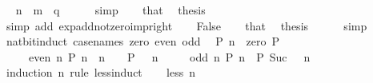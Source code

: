\begin{isabellebody}
\ \isamarkupfalse%
\ {\isacartoucheopen}n\ {\isacharequal}{\kern0pt}\ m\ {\isacharplus}{\kern0pt}\ q{\isacartoucheclose}\isanewline
\ \ \ \ \isamarkupfalse%
\ simp\isanewline
\ \ \isamarkupfalse%
\ that\ \isamarkupfalse%
\ {\isacharquery}{\kern0pt}thesis\isanewline
\ \ \ \ \isamarkupfalse%
\ {\isacharparenleft}{\kern0pt}simp\ add{\isacharcolon}{\kern0pt}\ exp{\isacharunderscore}{\kern0pt}add{\isacharunderscore}{\kern0pt}not{\isacharunderscore}{\kern0pt}zero{\isacharunderscore}{\kern0pt}imp{\isacharunderscore}{\kern0pt}right{\isacharparenright}{\kern0pt}\isanewline
{}\isamarkupfalse%
\isanewline
\ \ \isamarkupfalse%
\ False\isanewline
\ \ \isamarkupfalse%
\ that\ \isamarkupfalse%
\ {\isacharquery}{\kern0pt}thesis\isanewline
\ \ \ \ \isamarkupfalse%
\ simp\isanewline
{}\isamarkupfalse%
%
\endisatagproof
{\isafoldproof}%
%
\isadelimproof
\isanewline
%
\endisadelimproof
\isanewline
{}\isamarkupfalse%
\isanewline
\isanewline
{}\isamarkupfalse%
\ nat{\isacharunderscore}{\kern0pt}bit{\isacharunderscore}{\kern0pt}induct\ {\isacharbrackleft}{\kern0pt}case{\isacharunderscore}{\kern0pt}names\ zero\ even\ odd{\isacharbrackright}{\kern0pt}{\isacharcolon}{\kern0pt}\isanewline
\ \ {\isachardoublequoteopen}P\ n{\isachardoublequoteclose}\ \ zero{\isacharcolon}{\kern0pt}\ {\isachardoublequoteopen}P\ {}{\isachardoublequoteclose}\isanewline
\ \ \ \ \ even{\isacharcolon}{\kern0pt}\ {\isachardoublequoteopen}{\isasymAnd}n{\isachardot}{\kern0pt}\ P\ n\ {\isasymLongrightarrow}\ n\ {\isachargreater}{\kern0pt}\ {}\ {\isasymLongrightarrow}\ P\ {\isacharparenleft}{\kern0pt}{}\ {\isacharasterisk}{\kern0pt}\ n{\isacharparenright}{\kern0pt}{\isachardoublequoteclose}\isanewline
\ \ \ \ \ odd{\isacharcolon}{\kern0pt}\ {\isachardoublequoteopen}{\isasymAnd}n{\isachardot}{\kern0pt}\ P\ n\ {\isasymLongrightarrow}\ P\ {\isacharparenleft}{\kern0pt}Suc\ {\isacharparenleft}{\kern0pt}{}\ {\isacharasterisk}{\kern0pt}\ n{\isacharparenright}{\kern0pt}{\isacharparenright}{\kern0pt}{\isachardoublequoteclose}\isanewline
%
\isadelimproof
%
\endisadelimproof
%
\isatagproof
{}\isamarkupfalse%
\ {\isacharparenleft}{\kern0pt}induction\ n\ rule{\isacharcolon}{\kern0pt}\ less{\isacharunderscore}{\kern0pt}induct{\isacharparenright}{\kern0pt}\isanewline
\ \ \isamarkupfalse%
\ {\isacharparenleft}{\kern0pt}less\ n{\isacharparenright}{\kern0pt}\isanewline

\end{isabellebody}
